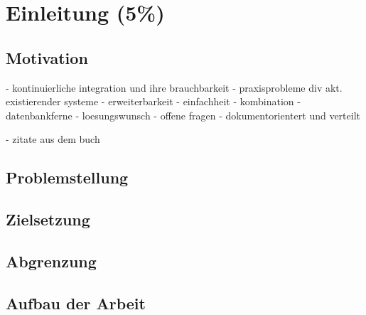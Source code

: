 \chapter{Einleitung (5\%) }

\section{Motivation}

- kontinuierliche integration und ihre brauchbarkeit
- praxisprobleme div akt. existierender systeme
  - erweiterbarkeit
  - einfachheit
  - kombination
- datenbankferne
- loesungswunsch
    - offene fragen
- dokumentorientert und verteilt


- zitate aus dem buch



\section{Problemstellung}


\section{Zielsetzung}


\section{Abgrenzung}


\section{Aufbau der Arbeit}


